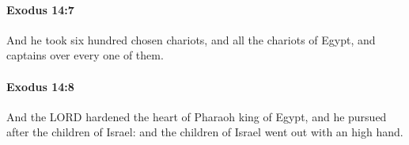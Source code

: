 		\paragraph{Exodus 14:7} %
			\label{EXODUS-14-7}

			And he took six hundred chosen chariots, and all the chariots of Egypt, and captains over every one of them.


		\paragraph{Exodus 14:8} %
			\label{EXODUS-14-8}

			And the LORD hardened the heart of Pharaoh king of Egypt, and he pursued after the children of Israel: and the children of Israel went out with an high hand.


